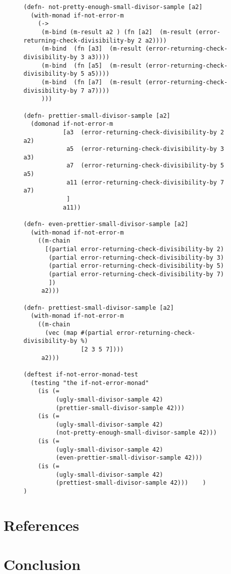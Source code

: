 \documentclass[11pt]{article}
\begin{document}
\begin{figure}[H]
\begin{verbatim}
(defn- not-pretty-enough-small-divisor-sample [a2]
  (with-monad if-not-error-m
    (->
     (m-bind (m-result a2 ) (fn [a2]  (m-result (error-returning-check-divisibility-by 2 a2))))
     (m-bind  (fn [a3]  (m-result (error-returning-check-divisibility-by 3 a3))))
     (m-bind  (fn [a5]  (m-result (error-returning-check-divisibility-by 5 a5))))
     (m-bind  (fn [a7]  (m-result (error-returning-check-divisibility-by 7 a7))))
     )))

(defn- prettier-small-divisor-sample [a2]
  (domonad if-not-error-m
           [a3  (error-returning-check-divisibility-by 2 a2)
            a5  (error-returning-check-divisibility-by 3 a3)
            a7  (error-returning-check-divisibility-by 5 a5)
            a11 (error-returning-check-divisibility-by 7 a7)
            ]
           a11))

(defn- even-prettier-small-divisor-sample [a2]
  (with-monad if-not-error-m
    ((m-chain
      [(partial error-returning-check-divisibility-by 2)
       (partial error-returning-check-divisibility-by 3)
       (partial error-returning-check-divisibility-by 5)
       (partial error-returning-check-divisibility-by 7)
       ])
     a2)))

(defn- prettiest-small-divisor-sample [a2]
  (with-monad if-not-error-m
    ((m-chain
      (vec (map #(partial error-returning-check-divisibility-by %)
                [2 3 5 7])))
     a2)))

(deftest if-not-error-monad-test
  (testing "the if-not-error-monad"
    (is (=
         (ugly-small-divisor-sample 42)
         (prettier-small-divisor-sample 42)))
    (is (=
         (ugly-small-divisor-sample 42)
         (not-pretty-enough-small-divisor-sample 42)))
    (is (=
         (ugly-small-divisor-sample 42)
         (even-prettier-small-divisor-sample 42)))
    (is (=
         (ugly-small-divisor-sample 42)
         (prettiest-small-divisor-sample 42)))    )
)
\end{verbatim}
\end{figure}
\section{References}
\label{sec-5}

\section{Conclusion}
\label{sec-6}
\end{document}
